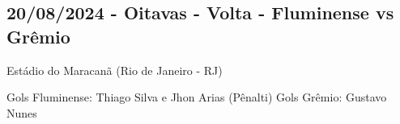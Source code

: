 \newpage
\subsection{20/08/2024 - Oitavas - Volta - Fluminense vs Grêmio}

\begin{figure}[H]
    \centering
    
\end{figure}

Estádio do Maracanã (Rio de Janeiro - RJ)

Gols Fluminense: Thiago Silva e Jhon Arias (Pênalti)
Gols Grêmio: Gustavo Nunes 